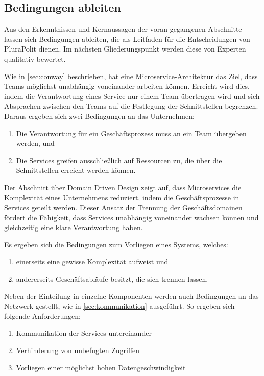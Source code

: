 \subsection{Bedingungen ableiten}
\label{sec:bedingungen}

Aus den Erkenntnissen und Kernaussagen der voran gegangenen Abschnitte lassen sich Bedingungen ableiten, die als Leitfaden für die Entscheidungen von PluraPolit dienen. Im nächsten Gliederungspunkt werden diese von Experten qualitativ bewertet.

Wie in \cref{sec:conway} beschrieben, hat eine Microservice-Architektur das Ziel, dass Teams möglichst unabhängig voneinander arbeiten können. Erreicht wird dies, indem die Verantwortung eines Service nur einem Team übertragen wird und sich Absprachen zwischen den Teams auf die Festlegung der Schnittstellen begrenzen. Daraus ergeben sich zwei Bedingungen an das Unternehmen:
\begin{enumerate}
	\item Die Verantwortung für ein Geschäftsprozess muss an ein Team übergeben werden, und
	\item Die Services greifen ausschließlich auf Ressourcen zu, die über die Schnittstellen erreicht werden können.
\end{enumerate}

Der Abschnitt über Domain Driven Design zeigt auf, dass Microservices die Komplexität eines Unternehmens reduziert, indem die Geschäftsprozesse in Services geteilt werden. Dieser Ansatz der Trennung der Geschäftsdomainen fördert die Fähigkeit, dass Services unabhängig voneinander wachsen können und gleichzeitig eine klare Verantwortung haben.

Es ergeben sich die Bedingungen zum Vorliegen eines Systems, welches:
\begin{enumerate}
	\item einerseits eine gewisse Komplexität aufweist und
	\item andererseits Geschäftsabläufe besitzt, die sich trennen lassen.
\end{enumerate}

Neben der Einteilung in einzelne Komponenten werden auch Bedingungen an das Netzwerk gestellt, wie in \cref{sec:kommunikation} ausgeführt. So ergeben sich folgende Anforderungen:
\begin{enumerate}
	\item Kommunikation der Services untereinander
	\item Verhinderung von unbefugten Zugriffen
	\item Vorliegen einer möglichst hohen Datengeschwindigkeit
\end{enumerate}

